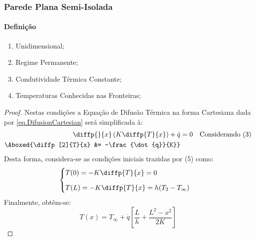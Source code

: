 \documentclass{article}
\begin{document}
        \subsubsection{Parede Plana Semi-Isolada}
            \paragraph{Definição}
                \begin{enumerate}[noitemsep]
                    \item Unidimensional;
                    \item Regime Permanente;
                    \item Condutividade Térmica Constante;
                    \item Temperaturas Conhecidas nas Fronteiras;
                \end{enumerate}
                \begin{proof}
                    Nestas condições a Equação de Difusão Térmica na forma Cartesiana dada por \ref{eq.DifusionCartesian} será simplificada à:
                        \begin{align*}
                            \diffp{}{x}\left(K\diffp{T}{x}\right) + \dot{q} &= 0 & \text{Considerando (3)}\\
                            \Aboxed{\diffp[2]{T}{x}                         &= -\frac{\dot{q}}{K}}\\
                        \end{align*}
                    Desta forma, considera-se as condições iniciais trazidas por (5) como:
                        \begin{equation*}
                            \begin{cases}
                                T(0) = -K\diffp{T}{x} = 0\\[2.5mm]
                                T(L) = -K\diffp{T}{x} = h(T_{2} - T_{\infty})\\
                            \end{cases}
                        \end{equation*}
                    Finalmente, obtêm-se:
                        \begin{equation}
                            \boxed{
                                T(x) = T_{\infty} + \dot{q} 
                                \left[
                                    \frac{L}{h} + \frac{L^{2} - x^{2}}{2K}
                                \right]
                            }
                        \end{equation}
                \end{proof}
\end{document}

